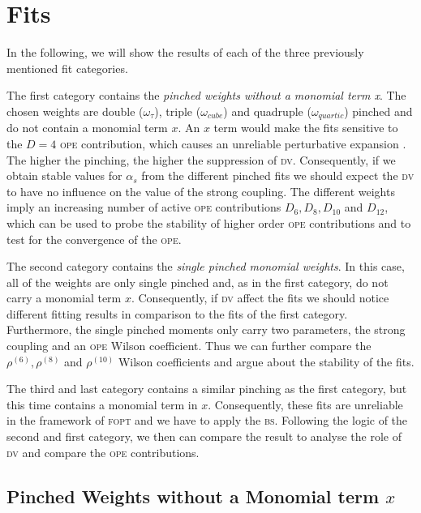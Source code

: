 \documentclass[../../index.tex]{subfiles}
\begin{document}
\section{Fits}
In the following, we will show the results of each of the three previously
mentioned fit categories.

The first category contains the \textit{pinched weights without a monomial term
  x}. The chosen weights are double (\(\omega_\tau\)), triple
(\(\omega_{cube}\)) and quadruple (\(\omega_{quartic}\)) pinched and do not
contain a monomial term \(x\). An \(x\) term would make the fits sensitive to
the \(D=4\) \textsc{ope} contribution, which causes an unreliable perturbative
expansion \cite{Beneke2012}. The higher the pinching, the higher the suppression
of \textsc{dv}. Consequently, if we obtain stable values for \(\alpha_s\) from
the different pinched fits we should expect the \textsc{dv} to have no influence
on the value of the strong coupling. The different weights imply an increasing
number of active \textsc{ope} contributions \(D_6, D_8, D_{10}\) and \(D_{12}\),
which can be used to probe the stability of higher order \textsc{ope}
contributions and to test for the convergence of the \textsc{ope}.

The second category contains the \textit{single pinched monomial weights}. In
this case, all of the weights are only single pinched and, as in the first
category, do not carry a monomial term \(x\). Consequently, if \textsc{dv}
affect the fits we should notice different fitting results in comparison to the
fits of the first category. Furthermore, the single pinched moments only carry
two parameters, the strong coupling and an \textsc{ope} Wilson coefficient. Thus
we can further compare the \(\rho^{(6)}, \rho^{(8)}\) and \(\rho^{(10)}\) Wilson
coefficients and argue about the stability of the fits.

The third and last category contains a similar pinching as the first category,
but this time contains a monomial term in \(x\). Consequently, these fits are
unreliable in the framework of \textsc{fopt} and we have to apply the
\textsc{bs}. Following the logic of the second and first category, we then can
compare the result to analyse the role of \textsc{dv} and compare the
\textsc{ope} contributions.

\subsection{Pinched Weights without a Monomial term \(x\)}
\end{document}
